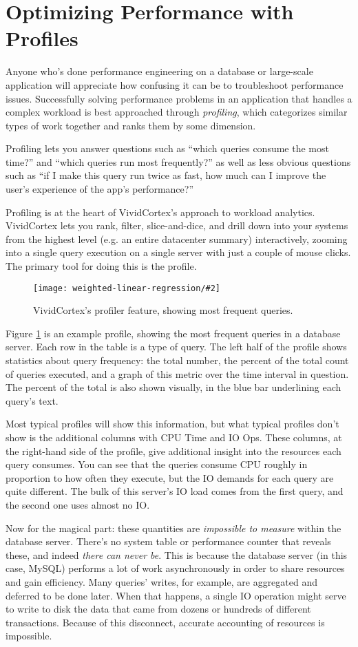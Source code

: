\documentclass{vivid_layout}
\newcommand{\myfig}[3]{
	\begin{figure}[!htpb]
	\begin{center}
	\rule{0mm}{5mm}
	\texttt{[image: weighted-linear-regression/\#2]}
	\caption{#3}\label{fig:#2}
	\end{center}
	\end{figure}
}
\begin{document}
\section{Optimizing Performance with Profiles}

Anyone who's done performance engineering on a database or large-scale application will appreciate how confusing it can be to troubleshoot performance issues. Successfully solving performance problems in an application that handles a complex workload is best approached through \emph{profiling}, which categorizes similar types of work together and ranks them by some dimension.

Profiling lets you answer questions such as ``which queries consume the most time?'' and ``which queries run most frequently?'' as well as less obvious questions such as ``if I make this query run twice as fast, how much can I improve the user's experience of the app's performance?''

Profiling is at the heart of VividCortex's approach to workload analytics. VividCortex lets you rank, filter, slice-and-dice, and drill down into your systems from the highest level (e.g. an entire datacenter summary) interactively, zooming into a single query execution on a single server with just a couple of mouse clicks. The primary tool for doing this is the profile.

\myfig{\textwidth}{profiler}{VividCortex's profiler feature, showing most frequent queries.}

Figure \ref{fig:profiler} is an example profile, showing the most frequent queries in a database server. Each row in the table is a type of query. The left half of the profile shows statistics about query frequency: the total number, the percent of the total count of queries executed, and a graph of this metric over the time interval in question. The percent of the total is also shown visually, in the blue bar underlining each query's text.

Most typical profiles will show this information, but what typical profiles don't show is the additional columns with CPU Time and IO Ops. These columns, at the right-hand side of the profile, give additional insight into the resources each query consumes. You can see that the queries consume CPU roughly in proportion to how often they execute, but the IO demands for each query are quite different. The bulk of this server's IO load comes from the first query, and the second one uses almost no IO.

Now for the magical part: these quantities are \emph{impossible to measure} within the database server. There's no system table or performance counter that reveals these, and indeed \emph{there can never be}. This is because the database server (in this case, MySQL) performs a lot of work asynchronously in order to share resources and gain efficiency. Many queries' writes, for example, are aggregated and deferred to be done later. When that happens, a single IO operation might serve to write to disk the data that came from dozens or hundreds of different transactions. Because of this disconnect, accurate accounting of resources is impossible.
\end{document}
